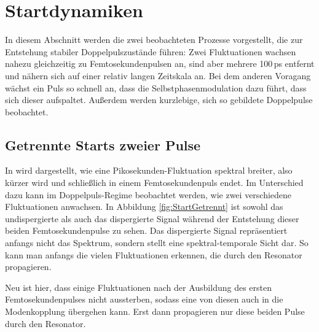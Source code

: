 \documentclass[bachelor,       %
               twoside,        %
               BCOR10mm,       %
               liststotoc,nomtotoc,bibtotoc, %
               english,ngerman, %
               final,          %
               ]{GAUBM}
\begin{document}
\clearpage

\section{Startdynamiken}
\label{sec:start}
In diesem Abschnitt werden die zwei beobachteten Prozesse vorgestellt, die zur Entstehung stabiler Doppelpulszustände führen:
Zwei Fluktuationen wachsen nahezu gleichzeitig zu Femtosekundenpulsen an, sind aber mehrere 100\,ps entfernt und nähern sich auf einer relativ langen Zeitskala an.
Bei dem anderen Voragang wächst ein Puls so schnell an, dass die Selbstphasenmodulation dazu führt, dass sich dieser aufspaltet.
Außerdem werden kurzlebige, sich so gebildete Doppelpulse beobachtet.

\subsection{Getrennte Starts zweier Pulse}
In \cite{herink_resolving_2016} wird dargestellt, wie eine Pikosekunden-Fluktuation  spektral breiter, also kürzer wird und schließlich in einem Femtosekundenpuls endet.
Im Unterschied dazu kann im Doppelpuls-Regime beobachtet werden, wie zwei verschiedene Fluktuationen anwachsen.
In Abbildung \ref{fig:StartGetrennt} ist sowohl das undispergierte als auch das dispergierte Signal während der Entstehung dieser beiden Femtosekundenpulse zu sehen.
Das dispergierte Signal repräsentiert anfangs nicht das Spektrum, sondern stellt eine spektral-temporale Sicht dar.
So kann man anfangs die vielen Fluktuationen erkennen, die durch den Resonator propagieren.

Neu ist hier, dass einige Fluktuationen nach der Ausbildung des ersten Femtosekundenpulses nicht aussterben, sodass eine von diesen auch in die Modenkopplung übergehen kann.
Erst dann propagieren nur diese beiden Pulse durch den Resonator.
\end{document}
